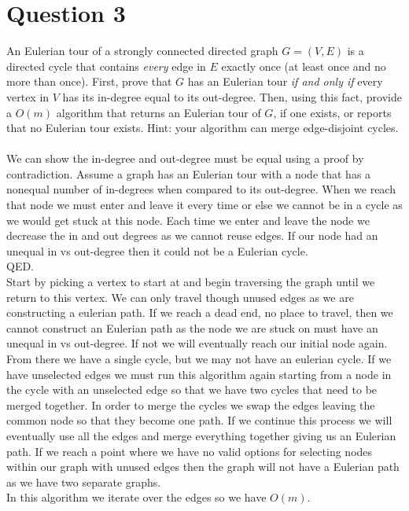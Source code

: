 \documentclass{article}
\begin{document}
\section*{Question 3}
An Eulerian tour of a strongly connected directed graph $G=(V, E)$ is a directed cycle that contains {\em every} edge in $E$ exactly once (at least once and no more than once).
First, prove that $G$ has an Eulerian tour {\em if and only if} every vertex in $V$ has its in-degree equal to its out-degree.
Then, using this fact, provide a $O(m)$ algorithm that returns an Eulerian tour of $G$, if one exists, or reports that no Eulerian tour exists.
Hint: your algorithm can merge edge-disjoint cycles.
\\ \\
We can show the in-degree and out-degree must be equal using a proof by contradiction.
Assume a graph has an Eulerian tour with a node that has a nonequal number of in-degrees when compared to its out-degree.
When we reach that node we must enter and leave it every time or else we cannot be in a cycle as we would get stuck at this node.
Each time we enter and leave the node we decrease the in and out degrees as we cannot reuse edges.
If our node had an unequal in vs out-degree then it could not be a Eulerian cycle.
\\ QED. \\

Start by picking a vertex to start at and begin traversing the graph until we return to this vertex.
We can only travel though unused edges as we are constructing a eulerian path.
If we reach a dead end, no place to travel, then we cannot construct an Eulerian path as the node we are stuck on must have an unequal in vs out-degree.
If not we will eventually reach our initial node again. From there we have a single cycle, but we may not have an eulerian cycle.
If we have unselected edges we must run this algorithm again starting from a node in the cycle with an unselected edge so that we have two cycles that need to be merged together.
In order to merge the cycles we swap the edges leaving the common node so that they become one path.
If we continue this process we will eventually use all the edges and merge everything together giving us an Eulerian path.
If we reach a point where we have no valid options for selecting nodes within our graph with unused edges then the graph will not have a Eulerian path as we have two separate graphs.
\\
In this algorithm we iterate over the edges so we have $O(m)$.
\end{document}
